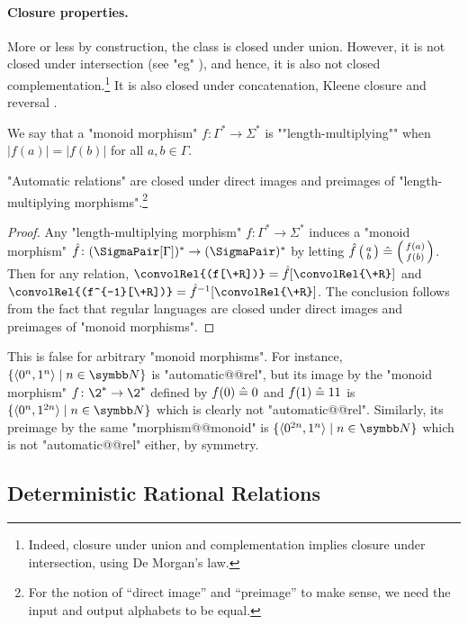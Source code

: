 \paragraph*{Closure properties.}
More or less by construction, the class is closed under union.
However, it is not closed under intersection
(see "eg" \cite[\S~III, Example~2.5]{Berstel1979Transductions}),
and hence, it is also not closed complementation.\footnote{Indeed, closure under union
and complementation implies closure under intersection, using De Morgan's law.}
It is also closed under concatenation, Kleene closure and reversal \cite[\S~3, Table~I]{FischerRosenberg1968Multitape}.

We say that a "monoid morphism" $f\colon \Gamma^* \to \Sigma^*$ is \AP""length-multiplying""
when $|f(a)| = |f(b)|$ for all $a, b \in \Gamma$.
\begin{proposition}
	\AP\label{prop:automatic-closure-length-multiplying-morphism}
	"Automatic relations" are closed under direct images and preimages of "length-multiplying 
	morphisms".\footnote{For the notion of ``direct image'' and ``preimage'' to make sense, we need
	the input and output alphabets to be equal.}
\end{proposition}
\begin{proof}
	Any "length-multiplying morphism" $f\colon \Gamma^* \to \Sigma^*$ induces
	a "monoid morphism" $\hat f\colon (\SigmaPair[\Gamma])^* \to (\SigmaPair)^*$ 
	by letting $\hat f \pair{a}{b} \defeq \pair{f(a)}{f(b)}$.
	Then for any relation, $\convolRel{(f[\+R])} = \hat f[\convolRel{\+R}]$
	and $\convolRel{(f^{-1}[\+R])} = \hat f^{-1}[\convolRel{\+R}]$.
	The conclusion follows from the fact that regular languages are closed under
	direct images and preimages of "monoid morphisms".
\end{proof}

This is false for arbitrary "monoid morphisms". For instance, $\set{\tup{0^n, 1^n} \mid n \in \N}$
is "automatic@@rel", but its image by the "monoid morphism" $f\colon \2^* \to \2^*$ defined by
$f(0) \mathrel{\hat{=}} 0$ and $f(1) \mathrel{\hat{=}} 11$ is $\set{\tup{0^n, 1^{2n}} \mid n\in \N}$ which is clearly not 
"automatic@@rel". Similarly, its preimage by the same "morphism@@monoid" is
$\set{\tup{0^{2n}, 1^{n}} \mid n \in \N}$ which is not "automatic@@rel" either, by symmetry.

\subsection{Deterministic Rational Relations}

